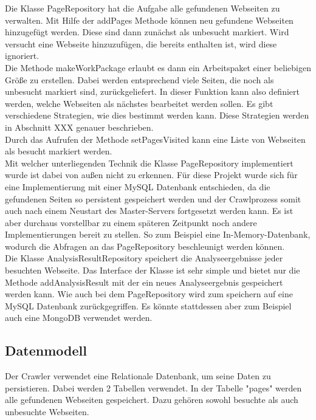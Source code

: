 Die Klasse PageRepository hat die Aufgabe alle gefundenen Webseiten zu verwalten. Mit Hilfe der addPages Methode können neu gefundene Webseiten hinzugefügt werden. Diese sind dann zunächst als unbesucht markiert. Wird versucht eine Webseite hinzuzufügen, die bereits enthalten ist, wird diese ignoriert.\\
Die Methode makeWorkPackage erlaubt es dann ein Arbeitspaket einer beliebigen Größe zu erstellen. Dabei werden entsprechend viele Seiten, die noch als unbesucht markiert sind, zurückgeliefert. In dieser Funktion kann also definiert werden, welche Webseiten als nächstes bearbeitet werden sollen. Es gibt verschiedene Strategien, wie dies bestimmt werden kann. Diese Strategien werden in Abschnitt XXX genauer beschrieben.\\
Durch das Aufrufen der Methode setPagesVisited kann eine Liste von Webseiten als besucht markiert werden. \\
Mit welcher unterliegenden Technik die Klasse PageRepository implementiert wurde ist dabei von außen nicht zu erkennen. Für diese Projekt wurde sich für eine Implementierung mit einer MySQL Datenbank entschieden, da die gefundenen Seiten so persistent gespeichert werden und der Crawlprozess somit auch nach einem Neustart des Master-Servers fortgesetzt werden kann. Es ist aber durchaus vorstellbar zu einem späteren Zeitpunkt noch andere Implementierungen bereit zu stellen. So zum Beispiel eine In-Memory-Datenbank, wodurch die Abfragen an das PageRepository beschleunigt werden können.\\
Die Klasse AnalysisResultRepository speichert die Analyseergebnisse jeder besuchten Webseite. Das Interface der Klasse ist sehr simple und bietet nur die Methode addAnalysisResult mit der ein neues Analyseergebnis gespeichert werden kann. Wie auch bei dem PageRepository wird zum speichern auf eine MySQL Datenbank zurückgegriffen. Es könnte stattdessen aber zum Beispiel auch eine MongoDB verwendet werden.

\subsection{Datenmodell}
Der Crawler verwendet eine Relationale Datenbank, um seine Daten zu persistieren. Dabei werden 2 Tabellen verwendet. In der Tabelle "pages" werden alle gefundenen Webseiten gespeichert. Dazu gehören sowohl besuchte als auch unbesuchte Webseiten.


